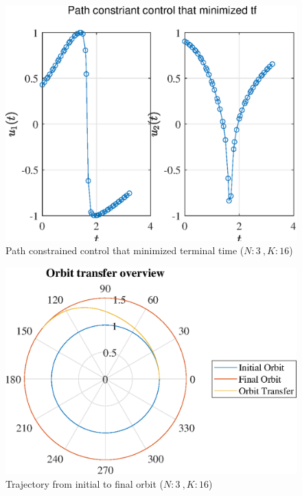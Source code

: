 \documentclass[]{article}
\begin{document}
	\begin{figure}
		\centering
		\includegraphics[scale=0.75]{path_N3_K16_C3_tf.eps}
		\caption{Path constrained control that minimized terminal time (\(N:3\ , K:16\))}
		\label{fig:path_N3_K16_C3_tf}
	\end{figure}
	\begin{figure}
		\centering
		\includegraphics[scale=0.75]{orbit_N3_K16_C3_tf.eps}
		\caption{Trajectory from initial to final orbit (\(N:3\ , K:16\))}
		\label{fig:orbit_N3_K16_C3_tf}
	\end{figure}
\end{document}
